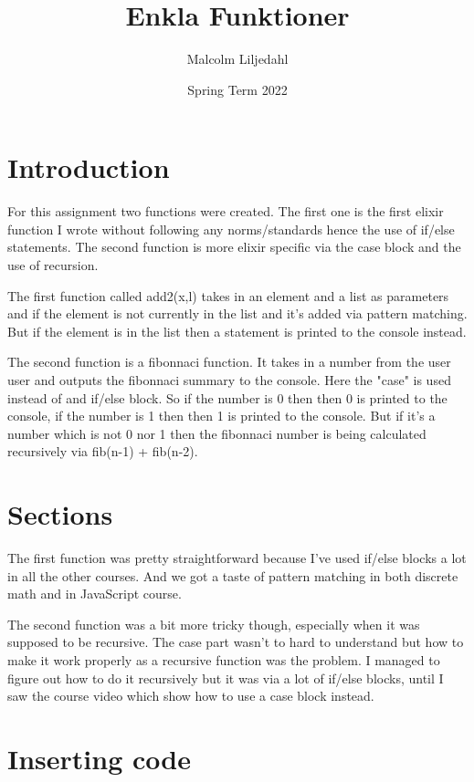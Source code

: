 \documentclass[a4paper,11pt]{article}
\begin{document}
\title{
    \textbf{Enkla Funktioner}
}
\author{Malcolm Liljedahl}
\date{Spring Term 2022}

\maketitle

\section*{Introduction}

For this assignment two functions were created. The first one is the first elixir function I wrote without following any norms/standards hence the use of if/else statements. The second function is more elixir specific via the case block and the use of recursion.

The first function called add2(x,l) takes in an element and a list as parameters and if the element is not currently in the list and it's added via pattern matching. But if the element is in the list then a statement is printed to the console instead.

The second function is a fibonnaci function. It takes in a number from the user user and outputs the fibonnaci summary to the console. Here the "case" is used instead of and if/else block. So if the number is 0 then then 0 is printed to the console, if the number is 1 then then 1 is printed to the console. But if it's a number which is not 0 nor 1 then the fibonnaci number is being calculated recursively via fib(n-1) + fib(n-2).

\section*{Sections}

The first function was pretty straightforward because I've used if/else blocks a lot in all the other courses. And we got a taste of pattern matching in both discrete math and in JavaScript course.

The second function was a bit more tricky though, especially when it was supposed to be recursive. The case part wasn't to hard to understand but how to make it work properly as a recursive function was the problem. I managed to figure out how to do it recursively but it was via a lot of if/else blocks, until I saw the course video which show how to use a case block instead.

\section*{Inserting code}
\end{document}
